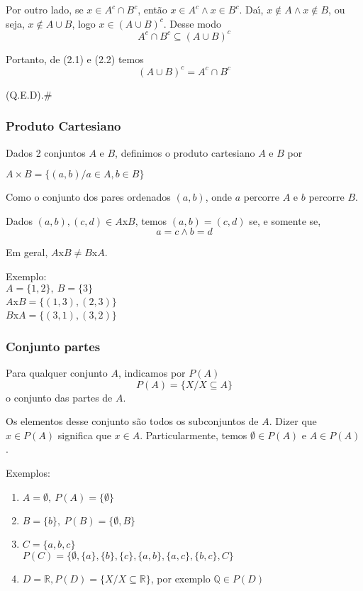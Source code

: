 Por outro lado, se $x\in A^{c}\cap B^{c}$, ent{\~a}o $x\in A^{c}\wedge x\in B^{c}$. Da{\'\i}, $x\notin A\wedge x\notin B$, ou seja, $x\notin A\cup B$, logo $x\in (A\cup B)^{c}$. Desse modo
\begin{equation}
A^{c}\cap B^{c}\subseteq(A\cup B)^{c}
\end{equation}

Portanto, de (2.1) e (2.2) temos \[(A\cup B)^{c}=A^{c}\cap B^{c}\]

(Q.E.D).\#\\

\subsubsection{Produto Cartesiano}

\begin{definicao} Dados 2 conjuntos $A$ e $B$, definimos o produto cartesiano $A$ e $B$ por
\begin{center}
$A\times B=\{(a,b)/a\in A,b\in B\}$
\end{center}
\end{definicao}

Como o conjunto dos pares ordenados $(a,b)$, onde $a$ percorre $A$ e $b$ percorre $B$.

Dados $(a,b),(c,d)\in A$x$B$, temos $(a,b)=(c,d)$ se, e somente se, \[a=c\wedge b=d\]

Em geral, $A$x$B\neq B$x$A$.

Exemplo:\\
$A=\{1,2\},\ B=\{3\}$\\
$A$x$B=\{(1,3),(2,3)\}$\\
$B$x$A=\{(3,1),(3,2)\}$

\subsubsection{Conjunto partes}

\begin{definicao} Para qualquer conjunto $A$, indicamos por $P(A)$\[P(A)=\{X/X\subseteq A\}\] o conjunto das partes de $A$.\end{definicao}

Os elementos desse conjunto s{\~a}o todos os subconjuntos de $A$. Dizer que $x\in P(A)$ significa que $x\in A$. Particularmente, temos $\emptyset\in P(A)$ e $A\in P(A)$.

Exemplos:
\begin{enumerate}
\item $A=\emptyset,\ P(A)=\{\emptyset\}$
\item $B=\{b\},\ P(B)=\{\emptyset,B\}$
\item $C=\{a,b,c\}$\\
$P(C)=\{\emptyset, \{a\}, \{b\},\{c\},\{a,b\},\{a,c\},\{b,c\},C\}$
\item $D=\mathbb{R},P(D)=\{X/X\subseteq\mathbb{R}\}$, por exemplo $\mathbb{Q}\in P(D)$
\end{enumerate}